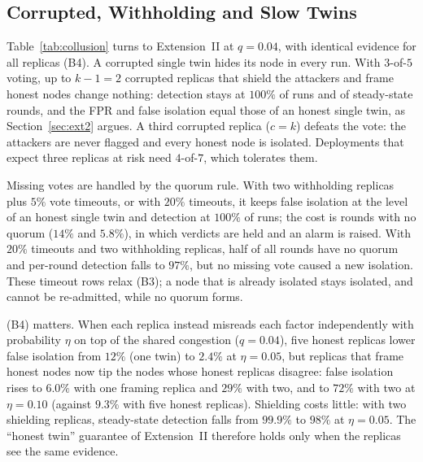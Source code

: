 \documentclass{ieeeaccess}
\begin{document}
\subsection{Corrupted, Withholding and Slow Twins}
\label{sec:res-ext2}
Table~\ref{tab:collusion} turns to Extension~II at $q=0.04$, with
identical evidence for all replicas (B4).  A
corrupted single twin hides its node in every run.  With $3$-of-$5$
voting, up to $k-1=2$ corrupted replicas that shield the attackers and
frame honest nodes change nothing: detection stays at $100\%$ of runs
and of steady-state rounds, and the FPR and false isolation equal those
of an honest single twin, as Section~\ref{sec:ext2} argues.  A third
corrupted replica ($c=k$) defeats the vote: the attackers are never
flagged and every honest node is isolated.  Deployments that expect
three replicas at risk need $4$-of-$7$, which tolerates them.

Missing votes are handled by the quorum rule.  With two withholding
replicas plus $5\%$ vote timeouts, or with $20\%$ timeouts, it keeps
false isolation at the level of an honest single twin and detection at
$100\%$ of runs; the cost is rounds with no quorum ($14\%$ and
$5.8\%$), in which verdicts are held and an alarm is raised.  With
$20\%$ timeouts and two withholding replicas, half of all rounds have
no quorum and per-round detection falls to $97\%$, but no missing
vote caused a new isolation.  These timeout rows relax (B3); a node
that is already isolated stays isolated, and cannot be re-admitted,
while no quorum forms.

(B4) matters.  When each replica instead misreads each factor
independently with probability $\eta$ on top of the shared congestion
($q=0.04$), five honest replicas lower false isolation from $12\%$
(one twin) to $2.4\%$ at $\eta=0.05$, but replicas that frame honest
nodes now tip the nodes whose honest replicas disagree: false
isolation rises to $6.0\%$ with one framing replica and $29\%$ with
two, and to $72\%$ with two at $\eta=0.10$ (against $9.3\%$ with
five honest replicas).  Shielding costs little: with two shielding
replicas, steady-state detection falls from $99.9\%$ to $98\%$ at
$\eta=0.05$.  The ``honest twin'' guarantee of Extension~II therefore
holds only when the replicas see the same evidence.
\end{document}
